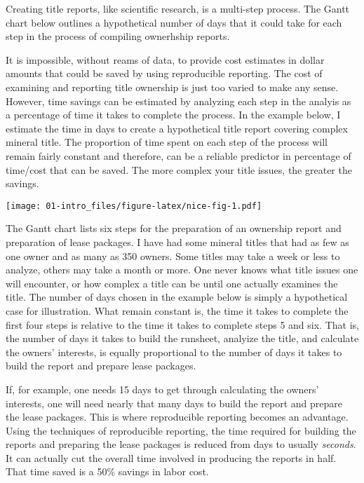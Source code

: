 \documentclass[
]{book}
\begin{document}
Creating title reports, like scientific research, is a multi-step process. The Gantt chart below outlines a hypothetical number of days that it could take for each step in the process of compiling ownerhship reports.

It is impossible, without reams of data, to provide cost estimates in dollar amounts that could be saved by using reproducible reporting. The cost of examining and reporting title ownership is just too varied to make any sense. However, time savings can be estimated by analyzing each step in the analyis as a percentage of time it takes to complete the process. In the example below, I estimate the time in days to create a hypothetical title report covering complex mineral title. The proportion of time spent on each step of the process will remain fairly constant and therefore, can be a reliable predictor in percentage of time/cost that can be saved. The more complex your title issues, the greater the savings.

\texttt{[image: 01-intro\_files/figure-latex/nice-fig-1.pdf]}

The Gantt chart lists six steps for the preparation of an ownership report and preparation of lease packages. I have had some mineral titles that had as few as one owner and as many as 350 owners. Some titles may take a week or less to analyze, others may take a month or more. One never knows what title issues one will encounter, or how complex a title can be until one actually examines the title. The number of days chosen in the example below is simply a hypothetical case for illustration. What remain constant is, the time it takes to complete the first four steps is relative to the time it takes to complete steps 5 and six. That is, the number of days it takes to build the runsheet, analyize the title, and calculate the owners' interests, is equally proportional to the number of days it takes to build the report and prepare lease packages.

If, for example, one needs 15 days to get through calculating the owners' interests, one will need nearly that many days to build the report and prepare the lease packages. This is where reproducible reporting becomes an advantage.\\
Using the techniques of reproducible reporting, the time required for building the reports and preparing the lease packages is reduced from days to usually \emph{seconds}. It can actually cut the overall time involved in producing the reports in half. That time saved is a 50\% savings in labor cost.
\end{document}
